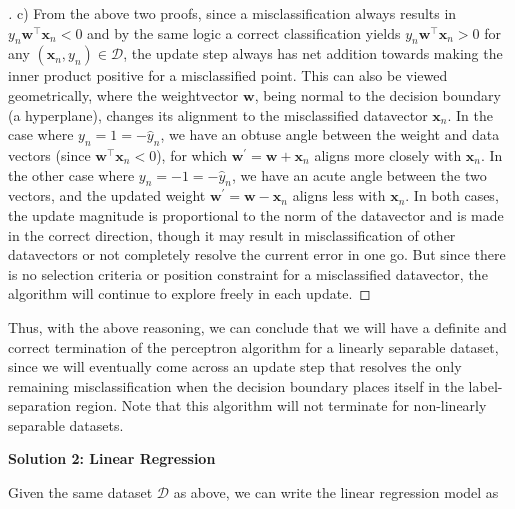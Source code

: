 \documentclass{article}
\renewcommand{\vec}[1]{\mathbf{#1}}
\begin{document}
    \begin{proof}[\unskip\nopunct]
        c) From the above two proofs, since a misclassification always 
        results in $y_n\vec{w}^\intercal \vec{x}_n < 0$ and by the same 
        logic a correct classification yields $y_n\vec{w}^\intercal \vec{x}_n
        > 0$ for any $(\vec{x}_n, y_n) \in \mathcal{D}$, the update step 
        always has net addition towards making the inner product positive for 
        a misclassified point. This can also be viewed geometrically, where
        the weightvector $\vec{w}$, being normal to the decision boundary (a 
        hyperplane), changes its alignment to the misclassified datavector 
        $\vec{x}_n$. In the case where $y_n = 1 = -\hat{y}_n$, we have an 
        obtuse angle between the  weight and data vectors (since $\vec
        {w}^\intercal \vec{x}_n < 0$), for which $\vec{w} ^{\prime} = \vec{w}+
        \vec{x}_n$ aligns more closely with $\vec{x}_n$. In the other case 
        where $y_n = -1 = -\hat{y}_n$, we have an acute angle between the two
        vectors, and the updated weight $\vec{w}^{\prime} =
        \vec{w} - \vec{x}_n$ aligns less with $\vec{x}_n$. In both cases, the
        update magnitude is proportional to the norm of the datavector and 
        is made in the correct direction, though it may result in
        misclassification of other datavectors or not completely 
        resolve the current error in one go. But since there is no selection
        criteria or position constraint for a misclassified datavector, the
        algorithm will continue to explore freely in each update.
    \end{proof}

    Thus, with the above reasoning, we can conclude that we will have a
    definite and correct termination of the perceptron algorithm for a 
    linearly separable dataset, since we will eventually come across an
    update step that resolves the only remaining misclassification when the
    decision boundary places itself in the label-separation region. Note that
    this algorithm will not terminate for non-linearly separable datasets.
    
    \vspace{0.5cm}

    \textbf{Solution 2: Linear Regression}

    Given the same dataset $\mathcal{D}$ as above, we can write the linear 
    regression model as
\end{document}
